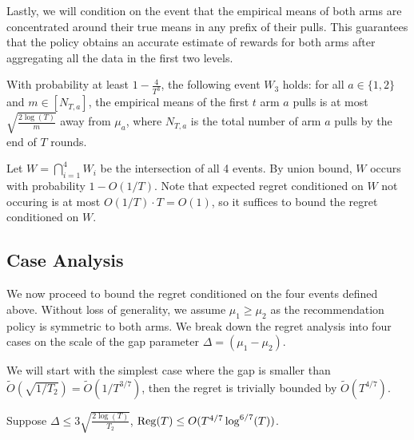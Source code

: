 Lastly, we will condition on the event that the empirical means of
both arms are concentrated around their true means in any prefix of
their pulls. This guarantees that the policy obtains an accurate
estimate of rewards for both arms after aggregating all the data in
the first two levels.


 

\begin{lemma}\label{3levelw3}
  With probability at least $1 - \frac{4}{T^3}$, the following event
  $W_3$ holds: for all $a\in \{1, 2\}$ and $m \in [N_{T, a}]$, the
  empirical means of the first $t$  arm $a$ pulls is at most
  $\sqrt{\frac{2\log(T)}{m}}$ away from $\mu_a$, where $N_{T, a}$ is
  the total number of arm $a$ pulls by the end of $T$ rounds.
\end{lemma}




Let $W = \bigcap_{i=1}^4 W_i$ be the intersection of all 4 
events.  By union bound, $W$ occurs with probability $1-O(1/T)$. Note
that expected regret conditioned on $W$ not occuring is at most
$O(1/T) \cdot T = O(1)$, so it suffices to bound the regret conditioned on $W$.

\subsection{Case Analysis}

We now proceed to bound the regret conditioned on the four 
events defined above. Without loss of generality, we assume
$\mu_1 \geq \mu_2$ as the recommendation policy is symmetric to both
arms. We break down the regret analysis into four cases on the scale
of the gap parameter $\Delta = (\mu_1-\mu_2)$.


We will start with the simplest case where the gap is smaller than
$\tilde O(\sqrt{1/T_2}) = \tilde O(1/T^{3/7})$, then the regret is
trivially bounded by $\tilde O(T^{4/7})$.

\begin{claim}
  Suppose $\Delta \leq 3\sqrt{\frac{2\log(T)}{T_2}}$,
  $\mathrm{Reg}(T)\leq O(T^{4/7} \log^{6/7}(T))$.
\end{claim}

